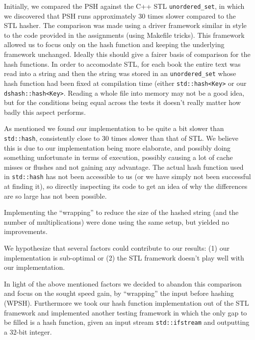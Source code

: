 \documentclass[]{article}
\newcommand{\funk}[1]{\small\texttt{#1}}
\newcommand{\cpp}{C+\!+\xspace}
\begin{document}
Initially, we compared the PSH against the \cpp STL \funk{unordered\_set}, in which we discovered that PSH runs approximately 30 times slower compared to the STL hasher. The comparison was made using a driver framework similar in style to the code provided in the assignments (using Makefile tricks). This framework allowed us to focus only on the hash function and keeping the underlying framework unchanged. Ideally this should give a fairer basis of comparison for the hash functions. In order to accomodate STL, for each book the entire text was read into a string and then the string was stored in an \funk{unordered\_set} whose hash function had been fixed at compilation time (either \funk{std::hash<Key>} or our \funk{dshash::hash<Key>}. Reading a whole file into memory may not be a good idea, but for the conditions being equal across the tests it doesn't really matter how badly this aspect performs.

As mentioned we found our implementation to be quite a bit slower than \funk{std::hash}, consistently close to 30 times slower than that of STL. We believe this is due to our implementation being more elaborate, and possibly doing something unfortunate in terms of execution, possibly causing a lot of cache misses or flushes and not gaining any advantage. The actual hash function used in \funk{std::hash} has not been accessible to us (or we have simply not been successful at finding it), so directly inspecting its code to get an idea of why the differences are so large has not been possible.

Implementing the ``wrapping'' to reduce the size of the hashed string (and the number of multiplications) were done using the same setup, but yielded no improvements.

We hypothesize that several factors could contribute to our results: (1) our implementation is sub-optimal or (2) the STL framework doesn't play well with our implementation.

In light of the above mentioned factors we decided to abandon this comparison and focus on the sought speed gain, by ``wrapping'' the input before hashing (WPSH). Furthermore we took our hash function implementation out of the STL framework and implemented another testing framework in which the only gap to be filled is a hash function, given an input stream \funk{std::ifstream} and outputting a 32-bit integer.



\end{document}
